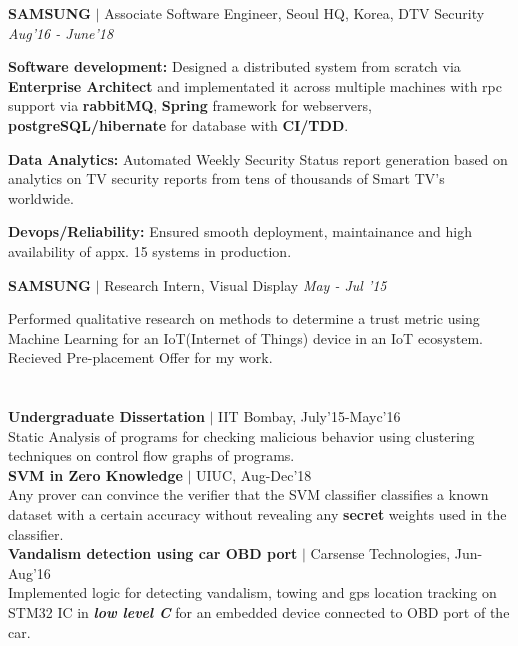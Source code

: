 \documentclass[margin,line]{resume}
\begin{document}
\begin{resume}
\textbf{SAMSUNG} $\mid$ Associate Software Engineer, Seoul HQ, Korea, DTV Security  
\hfill 
\textit{Aug'16 - June'18} \\
\vspace{-3.5mm}
\begin{list2}
    \item \textbf{Software development:} Designed a distributed system from scratch via \textbf{Enterprise Architect} and implementated it across multiple machines with rpc support via \textbf{rabbitMQ}, \textbf{Spring} framework for webservers, \textbf{postgreSQL/hibernate} for database with \textbf{CI/TDD}.   
    \vspace{1mm}
    \item \textbf{Data Analytics:} Automated Weekly Security Status report generation based on analytics on TV security reports from tens of thousands of Smart TV’s worldwide.
    \vspace{1mm}
    \item \textbf{Devops/Reliability:} Ensured smooth deployment, maintainance and high availability of appx. 15 systems in production.
\end{list2}
\vspace{-3.5mm}
\textbf{SAMSUNG} $\mid$ Research Intern, Visual Display \hfill \textit{May - Jul '15} \\
\vspace{-3.5mm}
\begin{list2}
\item Performed qualitative research on methods to determine a trust metric using Machine Learning for an IoT(Internet of Things) device in an IoT ecosystem. Recieved Pre-placement Offer for my work.
\end{list2}

\vspace{-2mm}
\section{}
\textbf{Undergraduate Dissertation} $\mid$ IIT Bombay, July'15-Mayc'16\\
Static Analysis of programs for checking malicious behavior using clustering techniques on control flow graphs of programs.\\
\textbf{SVM in Zero Knowledge} $\mid$ UIUC, Aug-Dec'18\\
Any prover can convince the verifier that the SVM classifier classifies a known dataset with a certain accuracy without revealing any \textbf{secret} weights used in the classifier. \vspace{1mm}\\ 
\textbf{Vandalism detection using car OBD port} $\mid$ Carsense Technologies, Jun-Aug'16 \\
    Implemented logic for detecting vandalism, towing and gps location tracking on STM32 IC in \textbf{\textit{low level C}} for an embedded device connected to OBD port of the car. 
\vspace{-7mm} \\


\end{resume}
\end{document}
